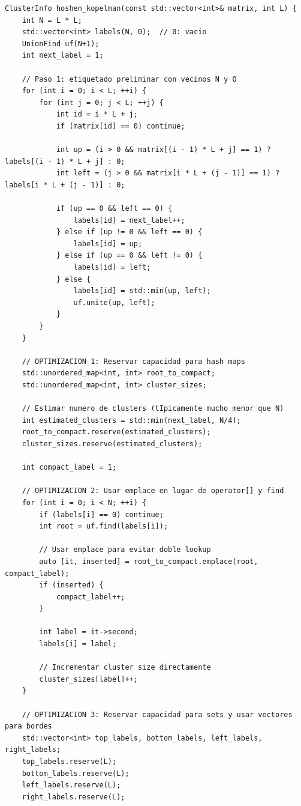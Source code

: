 \documentclass[12pt,a4paper]{article}
\begin{document}
\begin{lstlisting}[style=cpp-style]
ClusterInfo hoshen_kopelman(const std::vector<int>& matrix, int L) {
    int N = L * L;
    std::vector<int> labels(N, 0);  // 0: vacio
    UnionFind uf(N+1);
    int next_label = 1;

    // Paso 1: etiquetado preliminar con vecinos N y O
    for (int i = 0; i < L; ++i) {
        for (int j = 0; j < L; ++j) {
            int id = i * L + j;
            if (matrix[id] == 0) continue;

            int up = (i > 0 && matrix[(i - 1) * L + j] == 1) ? labels[(i - 1) * L + j] : 0;
            int left = (j > 0 && matrix[i * L + (j - 1)] == 1) ? labels[i * L + (j - 1)] : 0;

            if (up == 0 && left == 0) {
                labels[id] = next_label++;
            } else if (up != 0 && left == 0) {
                labels[id] = up;
            } else if (up == 0 && left != 0) {
                labels[id] = left;
            } else {
                labels[id] = std::min(up, left);
                uf.unite(up, left);
            }
        }
    }

    // OPTIMIZACION 1: Reservar capacidad para hash maps
    std::unordered_map<int, int> root_to_compact;
    std::unordered_map<int, int> cluster_sizes;
    
    // Estimar numero de clusters (tIpicamente mucho menor que N)
    int estimated_clusters = std::min(next_label, N/4);
    root_to_compact.reserve(estimated_clusters);
    cluster_sizes.reserve(estimated_clusters);
    
    int compact_label = 1;

    // OPTIMIZACION 2: Usar emplace en lugar de operator[] y find
    for (int i = 0; i < N; ++i) {
        if (labels[i] == 0) continue;
        int root = uf.find(labels[i]);

        // Usar emplace para evitar doble lookup
        auto [it, inserted] = root_to_compact.emplace(root, compact_label);
        if (inserted) {
            compact_label++;
        }

        int label = it->second;
        labels[i] = label;
        
        // Incrementar cluster size directamente
        cluster_sizes[label]++;
    }

    // OPTIMIZACION 3: Reservar capacidad para sets y usar vectores para bordes
    std::vector<int> top_labels, bottom_labels, left_labels, right_labels;
    top_labels.reserve(L);
    bottom_labels.reserve(L);
    left_labels.reserve(L);
    right_labels.reserve(L);


\end{lstlisting}
\end{document}

